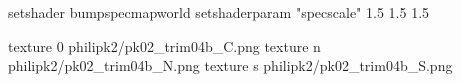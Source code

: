 setshader bumpspecmapworld
setshaderparam "specscale" 1.5 1.5 1.5

texture 0 philipk2/pk02_trim04b_C.png
texture n philipk2/pk02_trim04b_N.png
texture s philipk2/pk02_trim04b_S.png

